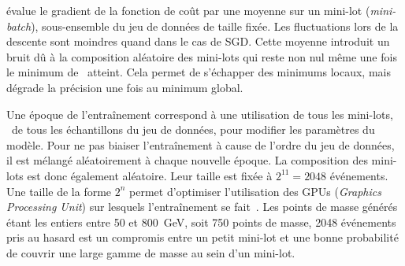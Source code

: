 évalue le gradient de la fonction de coût
par une moyenne
sur un \og mini-lot \fg{} (\emph{mini-batch}), sous-ensemble du jeu de données de taille fixée.
Les fluctuations lors de la descente sont moindres quand dans le cas de SGD.
Cette moyenne introduit un bruit dû à la composition aléatoire des mini-lots
qui reste non nul même une fois le minimum de \Loss\ atteint.
Cela permet de s'échapper des minimums locaux, mais dégrade la précision une fois au minimum global.
\par
Une \og époque \fg{} de l'entraînement correspond à une utilisation de tous les mini-lots, \ie\ de tous les échantillons du jeu de données, pour modifier les paramètres du modèle.
Pour ne pas biaiser l'entraînement à cause de l'ordre du jeu de données,
il est mélangé aléatoirement à chaque nouvelle époque.
La composition des mini-lots est donc également aléatoire.
Leur taille est fixée à $2^{11}=\num{2048}$ événements.
Une taille de la forme $2^n$ permet d'optimiser l'utilisation des GPUs (\emph{Graphics Processing Unit}) sur lesquels l'entraînement se fait~\cite{DNN}.
Les points de masse générés étant les entiers entre \num{50} et \SI{800}{\GeV}, soit \num{750} points de masse,
\num{2048} événements pris au hasard est un compromis entre
un petit mini-lot
et
une bonne probabilité de couvrir une large gamme de masse au sein d'un mini-lot.